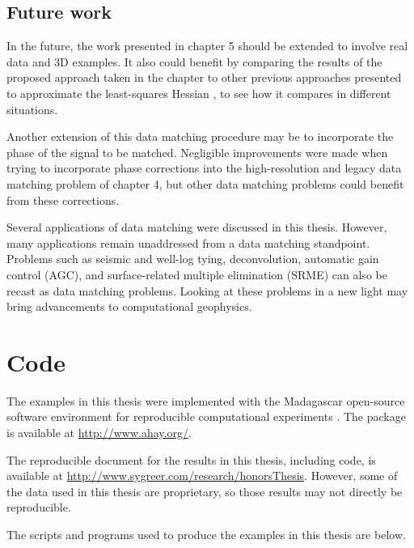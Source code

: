 \subsection{Future work}
In the future, the work presented in chapter 5 should be extended to involve real data and 3D examples. 
It also could benefit by comparing the results of the proposed approach taken in the chapter to other previous approaches presented to approximate the least-squares Hessian \cite[]{migdec,lsamp,siklsm,pwlsrtm,diagamp,debfilt,prestack,poststack}, to see how it compares in different situations.

Another extension of this data matching procedure may be to incorporate
the phase of the signal to be matched. 
Negligible improvements were made when trying to incorporate phase corrections into the high-resolution and legacy data matching problem of chapter 4, but other data matching problems could benefit from these corrections.

Several applications of data matching were discussed in this thesis. 
However, many applications remain unaddressed from a data matching standpoint. 
Problems such as seismic and well-log tying, deconvolution, automatic gain control (AGC), and surface-related multiple elimination (SRME) can also be recast as data matching problems. Looking at these problems in a new light may bring advancements to computational geophysics.



\appendix
\section{Code}
The examples in this thesis were implemented with the Madagascar open-source software environment for reproducible computational experiments \cite[]{madagascar}.
The package is available at \url{http://www.ahay.org/}.

The reproducible document for the results in this thesis, including code, is available at \url{http://www.sygreer.com/research/honorsThesis}.
However, some of the data used in this thesis are proprietary, so those results may not directly be reproducible.

The scripts and programs used to produce the examples in this thesis are below.


